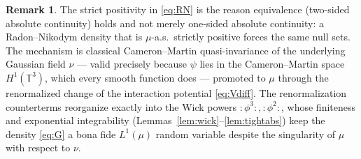 \documentclass[12pt]{article}
\theoremstyle{definition}
\newtheorem{remark}{Remark}
\newcommand{\T}{\mathbb{T}^3}
\newcommand{\Wick}[1]{{:}#1{:}}
\begin{document}
\begin{remark}
The strict positivity in \eqref{eq:RN} is the reason equivalence (two-sided absolute
continuity) holds and not merely one-sided absolute continuity: a Radon--Nikodym density
that is $\mu$-a.s.\ strictly positive forces the same null sets. The mechanism is
classical Cameron--Martin quasi-invariance of the underlying Gaussian field $\nu$ — valid
precisely because $\psi$ lies in the Cameron--Martin space $H^1(\T)$, which every smooth
function does — promoted to $\mu$ through the renormalized change of the interaction
potential \eqref{eq:Vdiff}. The renormalization counterterms reorganize exactly into the
Wick powers $\Wick{\phi^3},\Wick{\phi^2}$, whose finiteness and exponential integrability
(Lemmas~\ref{lem:wick}--\ref{lem:tightabs}) keep the density \eqref{eq:G} a bona fide
$L^1(\mu)$ random variable despite the singularity of $\mu$ with respect to $\nu$.
\end{remark}
\end{document}
